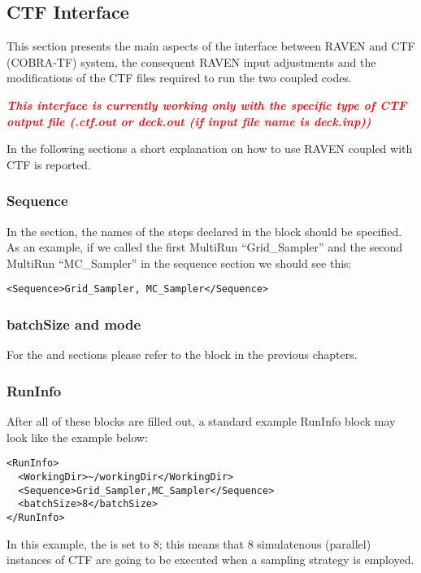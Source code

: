 \subsection{CTF Interface}
This section presents the main aspects of the interface between RAVEN and CTF (COBRA-TF) system,
the consequent RAVEN input adjustments and the modifications of the CTF
files required to run the two coupled codes. \noindent

\noindent \textcolor{red}{
\textbf{\textit{\nb This interface is currently working only with the specific type of CTF output file (.ctf.out or deck.out (if input file name is deck.inp)) }}
}

\noindent In the following sections a short explanation on how to use RAVEN coupled with CTF is reported.
\subsubsection{Sequence}
In the  section, the names of the steps declared in the
 block should be specified.
%
As an example, if we called the first MultiRun ``Grid\_Sampler'' and the second
MultiRun ``MC\_Sampler'' in the sequence section we should see this:

\begin{lstlisting}[style=XML]
<Sequence>Grid_Sampler, MC_Sampler</Sequence>
\end{lstlisting}

\subsubsection{batchSize and mode}
For the  and  sections please refer to the
 block in the previous chapters.

\subsubsection{RunInfo}
After all of these blocks are filled out, a standard example RunInfo block may
look like the example below: \\

\begin{lstlisting}[style=XML]
<RunInfo>
  <WorkingDir>~/workingDir</WorkingDir>
  <Sequence>Grid_Sampler,MC_Sampler</Sequence>
  <batchSize>8</batchSize>
</RunInfo>
\end{lstlisting}
In this example, the  is set to $8$; this means that 8 simulatenous (parallel) instances
of CTF are going to be executed when a sampling strategy is employed.

